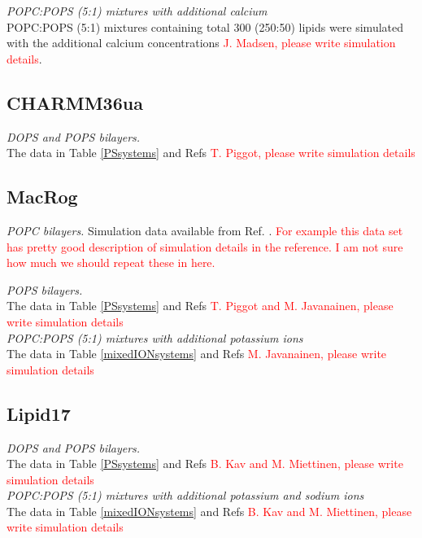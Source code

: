 \documentclass[journal=jpcbfk]{achemso}
\newcommand{\todo}[1]{\textcolor{red}{#1}}
\begin{document}
\noindent
{\it POPC:POPS (5:1) mixtures with additional calcium} \\
POPC:POPS (5:1) mixtures containing total 300 (250:50) lipids
were simulated with the additional calcium concentrations
\todo{J. Madsen, please write simulation details}. \\

\subsection{CHARMM36ua}
\noindent
{\it DOPS and POPS bilayers.} \\
The data in Table \ref{PSsystems} and Refs 
\todo{T. Piggot, please write simulation details} \\

\subsection{MacRog}
\noindent
    {\it POPC bilayers.} Simulation data available from Ref. .
    \todo{For example this data set has pretty good description of simulation details in the
      reference. I am not sure how much we should repeat these in here.}

\noindent
{\it POPS bilayers.} \\
The data in Table \ref{PSsystems} and Refs 
\todo{T. Piggot and M. Javanainen, please write simulation details} \\

\noindent
{\it POPC:POPS (5:1) mixtures with additional potassium ions} \\
The data in Table \ref{mixedIONsystems} and Refs 
\todo{M. Javanainen, please write simulation details} \\

\subsection{Lipid17}
{\it DOPS and POPS bilayers.} \\
The data in Table \ref{PSsystems} and Refs 
\todo{B. Kav and M. Miettinen, please write simulation details} \\

\noindent
{\it POPC:POPS (5:1) mixtures with additional potassium and sodium ions} \\
The data in Table \ref{mixedIONsystems} and Refs 
\todo{B. Kav and M. Miettinen, please write simulation details} \\
\end{document}

